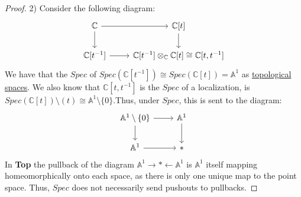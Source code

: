 \documentclass{article}
\newcommand{\bb}[1]{\mathbb{#1}}
\newcommand{\iso}{\cong}
\begin{document}
\begin{proof}
2) Consider the following diagram:
    \[
    \begin{tikzcd}
      \bb{C} \arrow[r] \arrow[d] & \bb{C}[t] \arrow[d] \\
      \bb{C}[t^{-1}] \arrow[r] & \bb{C}[t^{-1}] \otimes_{\bb{C}}\bb{C}[t] \iso \bb{C}[t,t^{-1}]
    \end{tikzcd}
  \]
  We have that the $Spec$ of $Spec(\bb{C}[t^{-1}]) \iso Spec(\bb{C}[t]) = \bb{A}^{1}$ as \underline{topological spaces}. We also know that $\bb{C}[t,t^{-1}]$ is the $Spec$ of a localization, is $Spec(\bb{C}[t]) \setminus (t) \iso \bb{A}^{1}\setminus \{0\}$.Thus, under $Spec$, this is sent to the diagram:
  \[
        \begin{tikzcd}
      \bb{A}^{1}\setminus \{0\} \arrow[r] \arrow[d]& \bb{A}^{1} \arrow[d] \\
      \bb{A}^{1} \arrow[r] & *
    \end{tikzcd}
  \]
  In \textbf{Top} the pullback of the diagram $\bb{A}^{1} \rightarrow * \leftarrow \bb{A}^{1}$ is $\bb{A}^{1}$ itself mapping homeomorphically onto each space, as there is only one unique map to the point space. Thus, $Spec$ does not necessarily send pushouts to pullbacks.  
\end{proof}
\end{document}
